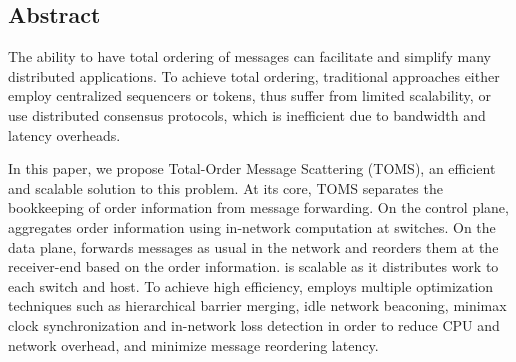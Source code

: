 \subsection*{Abstract}

The ability to have total ordering of messages can facilitate and simplify many distributed applications. To achieve total ordering, traditional approaches either employ centralized sequencers or tokens, thus suffer from limited scalability, or use distributed consensus protocols, which is inefficient due to bandwidth and latency overheads.

In this paper, we propose Total-Order Message Scattering (TOMS), an efficient and scalable solution to this problem. At its core, TOMS separates the bookkeeping of order information from message forwarding. On the control plane, \sys aggregates order information using in-network computation at switches. On the data plane, \sys forwards messages as usual in the network and reorders them at the receiver-end based on the order information. \sys is scalable as it distributes work to each switch and host. To achieve high efficiency, \sys employs multiple optimization techniques such as hierarchical barrier merging, idle network beaconing, minimax clock synchronization and in-network loss detection in order to reduce CPU and network overhead, and minimize message reordering latency.





